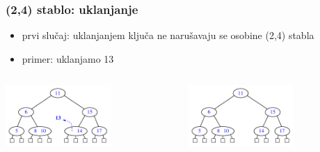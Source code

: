 \documentclass[compress]{beamer}
\begin{document}
\begin{frame}[fragile]
  \frametitle{(2,4) stablo: uklanjanje}
  \begin{itemize}
    \item prvi slučaj: uklanjanjem ključa ne narušavaju se osobine (2,4) stabla
    \item primer: uklanjamo 13
  \end{itemize}
  \begin{columns}
    \begin{column}[c]{6cm}
      \begin{center}
        \includegraphics[width=4cm]{asp-11-pic34a.pdf}
      \end{center}
    \end{column}
    \begin{column}[c]{6cm}
      \begin{center}
        \includegraphics[width=4cm]{asp-11-pic34b.pdf}
      \end{center}
    \end{column}
  \end{columns}
\end{frame}
\end{document}
